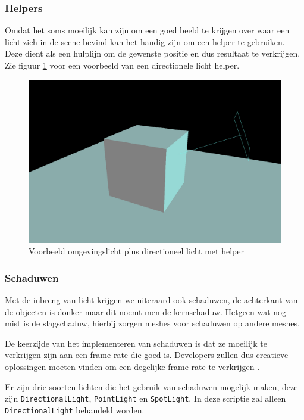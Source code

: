 \subsubsection{Helpers}

Omdat het soms moeilijk kan zijn om een goed beeld te krijgen over waar een licht zich in de scene bevind kan het handig zijn om een helper te gebruiken. Deze dient als een hulplijn om de gewenste positie en dus resultaat te verkrijgen. Zie figuur \ref{fig:directionalLightHelper} voor een voorbeeld van een directionele licht helper.

\begin{figure}[h]
	\centering
	\includegraphics[width=.7\linewidth]{graphics/directionalLightHelper}
	\caption[Voorbeeld omgevingslicht plus directioneel licht met helper]{Voorbeeld omgevingslicht plus directioneel licht met helper}
	\label{fig:directionalLightHelper}
\end{figure}

\subsubsection{Schaduwen}

Met de inbreng van licht krijgen we uiteraard ook schaduwen, de achterkant van de objecten is donker maar dit noemt men de kernschaduw. Hetgeen wat nog mist is de slagschaduw, hierbij zorgen meshes voor schaduwen op andere meshes.

De keerzijde van het implementeren van schaduwen is dat ze moeilijk te verkrijgen zijn aan een frame rate die goed is. Developers zullen dus creatieve oplossingen moeten vinden om een degelijke frame rate te verkrijgen \autocite{Simon2023}.

Er zijn drie soorten lichten die het gebruik van schaduwen mogelijk maken, deze zijn \texttt{DirectionalLight}, \texttt{PointLight} en \texttt{SpotLight}. In deze scriptie zal alleen \texttt{DirectionalLight} behandeld worden.

